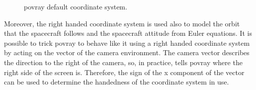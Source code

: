 \begin{figure}[htbp]
  \centering
  \qquad
  \caption{\acrshort{povray} default coordinate system.}
  \label{fig:povraycoordinatesystem}
\end{figure}

Moreover, the right handed coordinate system is used also to model the orbit that the spacecraft follows and the spacecraft attitude from Euler equations.
It is possible to trick \acrshort{povray} to behave like it using a right handed coordinate system by acting on the  vector of the camera environment. The camera  vector describes the direction to the right of the camera, so, in practice, tells \acrshort{povray} where the right side of the screen is. Therefore, the  sign of the x component of the  vector can be used to determine the handedness of the coordinate system in use.

